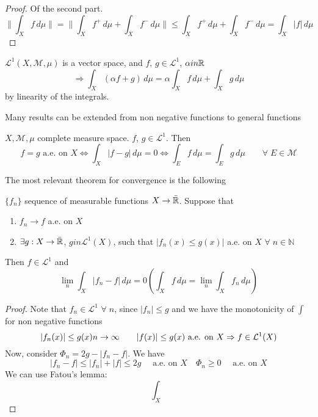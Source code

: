\begin{proof}
    Of the second part.
    \[
        \| \int_X f \, d\mu \| = \| \int_X f^+ \, d\mu + \int_X f^- \, d\mu\| \leq \int_X f^+ \, d\mu + \int_X f^- \, d\mu = \int_X |f| \, d\mu  
    \]
\end{proof}

\begin{proposition}
    \(\mathcal{L}^1(X, \mathcal{M}, \mu)\) is a vector space, and \(f, \, g \in \mathcal{L}^1\), \(\alpha in \mathbb{R}\)
    \[
        \Rightarrow \int_X \left(\alpha f + g \right) \, d\mu = \alpha \int_X f \, d\mu + \int_X g \, d\mu 
    \]  
    by linearity of the integrals.
\end{proposition}

Many results can be extended from non negative functions to general functions

\begin{theorem}
    \(X, \mathcal{M}, \mu\) complete measure space. \(f\), \(g \in \mathcal{L}^1\). Then
    \[
        f= g \text{ a.e. on } X \iff \int_X |f-g| \, d\mu =0 \iff \int_E f \, d\mu = \int_E g \, d\mu \qquad \forall \; E \in \mathcal{M} 
    \]
\end{theorem}
The most relevant theorem for convergence is the following
\begin{theorem}
    \(\{f_n\}\) sequence of measurable functions \(X \to \bar{\mathbb{R}}\). Suppose that
    \begin{enumerate}
        \item \(f_n \to f \) a.e. on \(X\)
        \item \(\exists g : X \to \bar{\mathbb{R} }\), \(g in \mathcal{L}^1(X)\), such that \(|f_n(x) \leq g(x)|\) a.e. on \(X\) \(\forall \; n \in \mathbb{N}\)
    \end{enumerate}
    Then \(f \in \mathcal{L}^1\) and 
    \[
        \lim_n \int_X |f_n -f| \, d\mu = 0 \left( \int_X f \, d\mu = \lim_n \int_X f_n \, d\mu \right)  
    \]
\end{theorem}
\begin{proof}
    Note that \(f_n \in \mathcal{L}^1\) \(\forall \; n\), since \(|f_n| \leq g\) and we have the monotonicity of \(\int\) for non negative functions
    \[
        |f_n(x)| \leq g(x) \\
        n \to \infty \qquad |f(x)| \leq g(x) \text{ a.e. on } X \\
        \Rightarrow f \in \mathcal{L}^1(X)
    \]  
    Now, consider \(\Phi_n = 2g - |f_n - f|\). We have
    \[
        |f_n-f| \leq |f_n|+|f| \leq 2g \quad \text{ a.e. on }X \quad \Phi_n \geq 0 \quad \text{ a.e. on }X  
    \]
    We can use Fatou's lemma:
    \[
        \int_X 
    \]  
\end{proof}